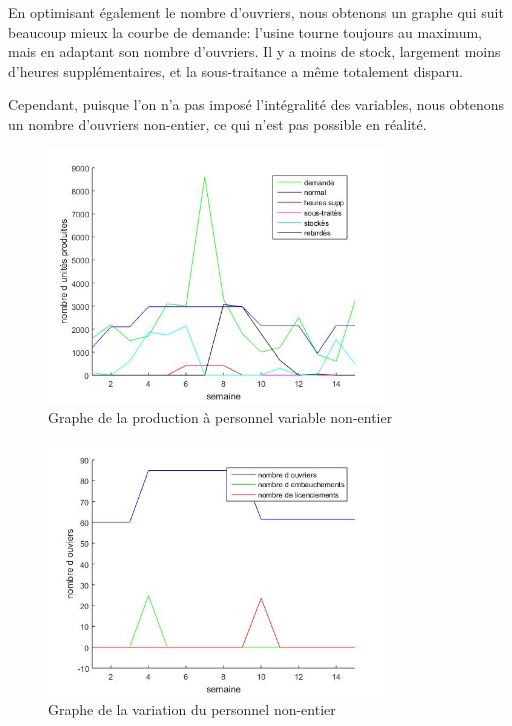 En optimisant également le nombre d'ouvriers, nous obtenons un graphe qui suit beaucoup mieux la courbe de demande: l'usine tourne toujours au maximum, mais en adaptant son nombre d'ouvriers. Il y a moins de stock, largement moins d'heures supplémentaires, et la sous-traitance a même totalement disparu.

Cependant, puisque l'on n'a pas imposé l'intégralité des variables, nous obtenons un nombre d'ouvriers non-entier, ce qui n'est pas possible en réalité.

\begin{figure}[H]
    \centering
    \includegraphics[width=0.8\textwidth]{graphes/graphq8.jpg}
    \caption{Graphe de la production à personnel variable non-entier}
    \label{fig:q8_01}
\end{figure}

\begin{figure}[H]
    \centering
    \includegraphics[width=0.8\textwidth]{graphes/ouvrierq8.jpg}
    \caption{Graphe de la variation du personnel non-entier}
    \label{fig:q8_02}
\end{figure}
